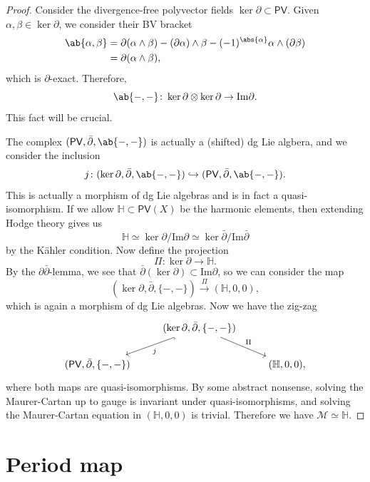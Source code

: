 \documentclass[article,10pt,oneside,oldfontcommands]{memoir}
\theoremstyle{definition}
\theoremstyle{remark}
\theoremstyle{plain}
\theoremstyle{definition}
\theoremstyle{remark}
\newcommand{\Ima}{\mathrm{Im}}
\newcommand{\mc}[1]{\mathcal{#1}}
\newcommand{\ms}[1]{\mathsf{#1}}
\newcommand{\1}{\mathbf{1}}
\newcommand{\2}{\mathbf{2}}
\newcommand{\3}{\mathbf{3}}
\newcommand{\dbar}{\bar{\partial}}
\begin{document}
\begin{proof}
    Consider the divergence-free polyvector fields \(\ker \partial \subset \ms{PV}\). Given \(\alpha, \beta \in \ker \partial\), we consider their BV bracket
    \begin{align*}
        \ab\{\alpha, \beta\} &= \partial(\alpha \wedge \beta) - (\partial \alpha) \wedge \beta - (-1)^{\abs{\alpha}} \alpha \wedge (\partial \beta) \\
        &= \partial(\alpha \wedge \beta),
    \end{align*}
    which is \(\partial\)-exact. Therefore,
    \[ \ab\{-,-\} \colon \ker \partial \otimes \ker \partial \to \Ima \partial. \]
    This fact will be crucial.

    The complex \((\ms{PV}, \dbar, \ab\{-,-\})\) is actually a (shifted) dg Lie algbera, and we consider the inclusion
    \[ j \colon (\ker \partial, \dbar, \ab\{-,-\}) \hookrightarrow (\ms{PV}, \dbar, \ab\{-,-\}). \]
    This is actually a morphism of dg Lie algebras and is in fact a quasi-isomorphism. If we allow \(\mathbb{H} \subset \ms{PV}(X)\) be the harmonic elements, then extending Hodge theory gives us
    \[ \mathbb{H} \simeq \ker \partial / \Ima \partial \simeq \ker \dbar / \Ima \dbar \]
    by the Kähler condition. Now define the projection
    \[ \Pi \colon \ker \partial \to \mathbb{H}. \]
    By the \(\partial\dbar\)-lemma, we see that \(\dbar (\ker \partial) \subset \Ima \partial\), so we can consider the map
    \[ (\ker \partial, \dbar, \{-,-\}) \xrightarrow{\Pi} (\mathbb{H}, 0, 0), \]
    which is again a morphism of dg Lie algebras. Now we have the zig-zag
    \begin{equation*}
    \begin{tikzcd}
        & (\ker \partial, \dbar, \{-,-\}) \ar[hookrightarrow]{dl}{j} \ar{dr}{\Pi} \\
        (\ms{PV}, \dbar, \{-,-\}) & & (\mathbb{H}, 0, 0),
    \end{tikzcd}
    \end{equation*}
    where both maps are quasi-isomorphisms. By some abstract nonsense, solving the Maurer-Cartan up to gauge is invariant under quasi-isomorphisms, and solving the Maurer-Cartan equation in \((\mathbb{H}, 0, 0)\) is trivial. Therefore we have \(\mc{M} \simeq \mathbb{H}\).
\end{proof}



\chapter{Period map}%
\label{cha:Period map}
\end{document}
